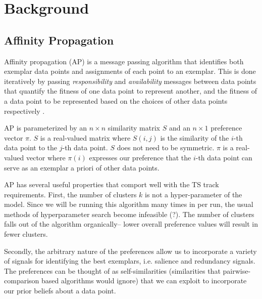 \documentclass{sig-alternate}
\begin{document}









\section{Background}\label{sec:background}

\subsection{Affinity Propagation}

Affinity propagation (AP) is a message passing algorithm that identifies both
exemplar data points and assignments of each point to an exemplar.  This is
done iteratively by passing \emph{responsibility} and \emph{availability}
messages between data points that quantify the fitness of one data point to
represent another, and the fitness of a data point to be represented based on
the choices of other data points respectively \cite{dueck2007non}.

AP is parameterized by an $n\times n$ similarity matrix $S$ and an $n\times 1$
preference vector $\pi$.  $S$ is a real-valued matrix where $S(i,j)$ is the
similarity of the $i$-th data point to the $j$-th data point.  $S$ does not
need to be symmetric.  $\pi$ is a real-valued vector where $\pi(i)$ expresses
our preference that the $i$-th data point can serve as an exemplar a priori of
other data points. 




AP has several useful properties that comport well with the TS track 
requirements. First, the number of clusters $k$ is not a hyper-parameter
of the model. Since we will be running this algorithm many times in per run,
the usual methods of hyperparameter search become infeasible 
(?). The number of clusters falls out of the algorithm
organically-- lower overall preference values will result in fewer clusters. 

Secondly, the arbitrary nature of the preferences
allow us to incorporate a variety of signals for
identifying the best exemplars, i.e. salience and redundancy signals. 
The preferences can be thought of as self-similarities (similarities that
pairwise-comparison based algorithms would ignore) that we can exploit to 
incorporate our prior beliefs about a data point.
\end{document}
